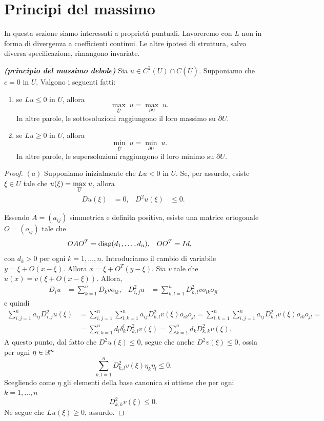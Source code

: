 \section{Principi del massimo}
In questa sezione siamo interessati a proprietà puntuali. Lavoreremo con $L$ non in forma di divergenza a coefficienti continui. Le altre ipotesi di struttura, salvo diversa specificazione, rimangono invariate.
\begin{teorema}\emph{\textbf{(principio del massimo debole)}}
	Sia $u \in C^2(U)\cap C(\overline{U}) $. Supponiamo che $c = 0 $ in $U$. Valgono i seguenti fatti:
	\begin{enumerate}[$(a)$]
		\item se $Lu \le 0$ in $U$, allora
		\[ \underset{\overline{U}}{\max} \; u = \underset{\partial U}{\max} \; u. \]
		In altre parole, le sottosoluzioni raggiungono il loro massimo su $\partial U$.
		\item se $Lu \ge 0$ in $U$, allora
		\[ \underset{\overline{U}}{\min} \; u = \underset{\partial U}{\min} \; u. \]
		In altre parole, le supersoluzioni raggiungono il loro minimo su $\partial U$.
	\end{enumerate}
	
	\begin{proof}\hfill
		\par\noindent
		$(a)$ Supponiamo inizialmente che $Lu < 0$ in $U$. Se, per assurdo, esiste $\xi \in U$ tale che $u(\xi) = \underset{\overline{U}}{\textup{max}}\; u$, allora
		\begin{align*}
			Du(\xi) &= 0, & D^2u(\xi) &\le 0.
		\end{align*}
		
		Essendo $A = (a_{ij})$ simmetrica e definita positiva, esiste una matrice ortogonale $O=(o_{ij})$ tale che 
		\begin{align*}
			OAO^T &= \textup{diag}(d_1,\dots,d_n), & OO^T&=Id,
		\end{align*}
		con $d_k> 0$ per ogni $k=1,\dots,n$. Introduciamo il cambio di variabile $y = \xi + O(x-\xi)$. Allora $x = \xi + O^T(y-\xi)$. Sia $v$ tale che $u(x) = v(\xi + O(x-\xi)).$ Allora,
		\begin{align*}
			D_i u &= \sum_{k=1}^{n} D_kv o_{ik}, & D^2_{i,j}u &= \sum_{k,l=1}^{n}D^2_{k,l}v o_{ik}o_{jl}
		\end{align*}
		e quindi
		\begin{align*}
			\sum_{i,j=1}^{n}a_{ij}D^2_{i,j}u(\xi) &= \sum_{i,j=1}^{n}\sum_{l,k=1}^{n}a_{ij}D^2_{k,l}v(\xi) o_{ik}o_{jl} = \sum_{l,k=1}^{n}\sum_{i,j=1}^{n}a_{ij}D^2_{k,l}v(\xi) o_{ik}o_{jl} = \\
			&= \sum_{l,k=1}^{n} d_l\delta_k^l D^2_{k,l}v(\xi) = \sum_{k=1}^{n}d_kD^2_{k,k}v(\xi).
		\end{align*}
		A questo punto, dal fatto che $D^2u(\xi) \le 0$, segue che anche $D^2v(\xi) \le 0$, ossia per ogni $\eta \in \mathbb{R}^n$
		\[ \sum_{k,l=1}^{n} D^2_{k,l} v(\xi) \eta_k\eta_l \le 0. \]
		Scegliendo come $\eta$ gli elementi della base canonica si ottiene che per ogni $k =1,\dots,n$ 
		\[ D^2_{k,k}v(\xi) \le 0. \]
		Ne segue che $Lu(\xi) \ge 0$, assurdo.
		

\end{proof}
\end{teorema}
